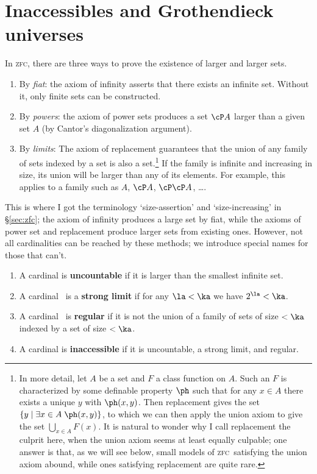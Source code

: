\documentclass[12pt]{amsart}
\def\zfc{\textsc{zfc}}
\begin{document}
\section{Inaccessibles and Grothendieck universes}
\label{sec:universes}

In \zfc, there are three ways to prove the existence of larger and
larger sets.
\begin{enumerate}[(1)]
\item By \emph{fiat}: the axiom of infinity asserts that there exists
  an infinite set.  Without it, only finite sets can be constructed.
\item By \emph{powers}: the axiom of power sets produces a set $\cP
  A$ larger than a given set $A$ (by Cantor's diagonalization
  argument).
\item By \emph{limits}: The axiom of replacement guarantees that the
  union of any family of sets indexed by a set is also a
  set.\footnote{In more detail, let $A$ be a set and $F$ a class
    function on $A$.  Such an $F$ is characterized by some definable
    property $\ph$ such that for any $x\in A$ there exists a unique
    $y$ with $\ph(x,y)$.  Then replacement gives the set $\{y \mid
    \exists x\in A\; \ph(x,y)\}$, to which we can then apply the union
    axiom to give the set $\bigcup_{x\in A} F(x)$.  It is natural to
    wonder why I call replacement the culprit here, when the union
    axiom seems at least equally culpable; one answer is that, as we
    will see below, small models of \zfc\ satisfying the union axiom
    abound, while ones satisfying replacement are quite rare.}  If the
  family is infinite and increasing in size, its union will be larger
  than any of its elements.  For example, this applies to a family
  such as $A$, $\cP A$, $\cP\cP A$, \dots.
\end{enumerate}
This is where I got the terminology `size-assertion' and
`size-increasing' in \S\ref{sec:zfc}; the axiom of infinity produces a
large set by fiat, while the axioms of power set and replacement
produce larger sets from existing ones.  However, not all
cardinalities can be reached by these methods; we introduce special
names for those that can't.
\begin{enumerate}
\item A cardinal is \textbf{uncountable} if it is larger than the
  smallest infinite set.
\item A cardinal \ka\ is a \textbf{strong limit} if for any $\la<\ka$ we
  have $2^\la < \ka$.
\item A cardinal \ka\ is \textbf{regular} if it is not the union of a
  family of sets of size $<\ka$ indexed by a set of size $<\ka$.
\item A cardinal is \textbf{inaccessible} if it is uncountable, a
  strong limit, and regular.
\end{enumerate}
\end{document}
